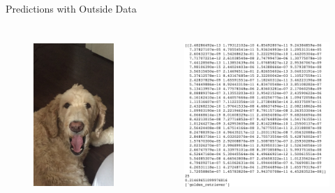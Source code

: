 \documentclass[leqno]{beamer}
\begin{document}
\begin{frame}{Predictions with Outside Data}
    \begin{columns}
        \begin{column}{0.45\textwidth}
            \begin{figure}
                \includegraphics[height=6cm]{max1.jpg}
            \end{figure}
        \end{column}
        \begin{column}{0.45\textwidth}
            \begin{figure}
                \includegraphics[height=6cm]{goldenRetriever.jpg}
            \end{figure}
        \end{column}
    \end{columns}
\end{frame}
\end{document}
